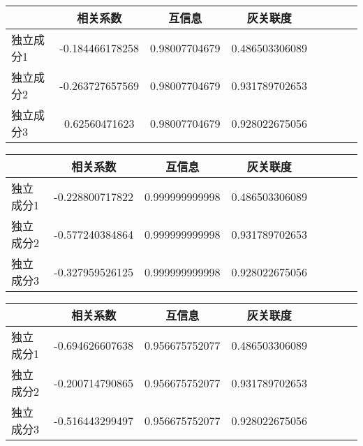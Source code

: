\begin{table}[!htbp] 
\begin{center}
\begin{tabular}{lccclccc} 
 \toprule 
& 相关系数   & 互信息    &灰关联度 \\ 
\midrule 
独立成分1	& -0.184466178258	& 0.98007704679	& 0.486503306089	\\ 
独立成分2	& -0.263727657569	& 0.98007704679	& 0.931789702653	\\ 
独立成分3	& 0.62560471623	& 0.98007704679	& 0.928022675056	\\ 
\bottomrule 
 \end{tabular} 
\end{center} 
 \end{table} 


\begin{table}[!htbp] 
\begin{center}
\begin{tabular}{lccclccc} 
 \toprule 
& 相关系数   & 互信息    &灰关联度 \\ 
\midrule 
独立成分1	& -0.228800717822	& 0.999999999998	& 0.486503306089	\\ 
独立成分2	& -0.577240384864	& 0.999999999998	& 0.931789702653	\\ 
独立成分3	& -0.327959526125	& 0.999999999998	& 0.928022675056	\\ 
\bottomrule 
 \end{tabular} 
\end{center} 
 \end{table} 


\begin{table}[!htbp] 
\begin{center}
\begin{tabular}{lccclccc} 
 \toprule 
& 相关系数   & 互信息    &灰关联度 \\ 
\midrule 
独立成分1	& -0.694626607638	& 0.956675752077	& 0.486503306089	\\ 
独立成分2	& -0.200714790865	& 0.956675752077	& 0.931789702653	\\ 
独立成分3	& -0.516443299497	& 0.956675752077	& 0.928022675056	\\ 
\bottomrule 
 \end{tabular} 
\end{center} 
 \end{table} 
